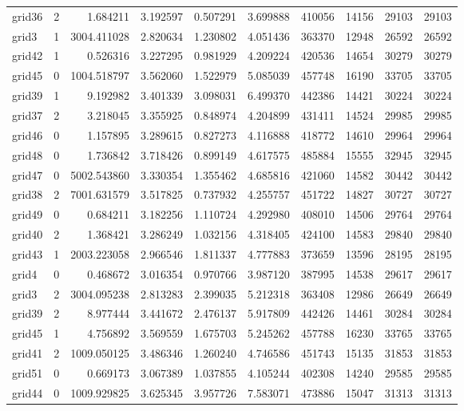 \documentclass[../../../thesis.tex]{subfiles}
\begin{document}
\begin{longtable}{|l|r|r|r|r|r|r|r|r|r|}
grid36 & 2 & 1.684211 & 3.192597 & 0.507291 & 3.699888 & 410056 & 14156 & 29103 & 29103 \\
grid3 & 1 & 3004.411028 & 2.820634 & 1.230802 & 4.051436 & 363370 & 12948 & 26592 & 26592 \\
grid42 & 1 & 0.526316 & 3.227295 & 0.981929 & 4.209224 & 420536 & 14654 & 30279 & 30279 \\
grid45 & 0 & 1004.518797 & 3.562060 & 1.522979 & 5.085039 & 457748 & 16190 & 33705 & 33705 \\
grid39 & 1 & 9.192982 & 3.401339 & 3.098031 & 6.499370 & 442386 & 14421 & 30224 & 30224 \\
grid37 & 2 & 3.218045 & 3.355925 & 0.848974 & 4.204899 & 431411 & 14524 & 29985 & 29985 \\
grid46 & 0 & 1.157895 & 3.289615 & 0.827273 & 4.116888 & 418772 & 14610 & 29964 & 29964 \\
grid48 & 0 & 1.736842 & 3.718426 & 0.899149 & 4.617575 & 485884 & 15555 & 32945 & 32945 \\
grid47 & 0 & 5002.543860 & 3.330354 & 1.355462 & 4.685816 & 421060 & 14582 & 30442 & 30442 \\
grid38 & 2 & 7001.631579 & 3.517825 & 0.737932 & 4.255757 & 451722 & 14827 & 30727 & 30727 \\
grid49 & 0 & 0.684211 & 3.182256 & 1.110724 & 4.292980 & 408010 & 14506 & 29764 & 29764 \\
grid40 & 2 & 1.368421 & 3.286249 & 1.032156 & 4.318405 & 424100 & 14583 & 29840 & 29840 \\
grid43 & 1 & 2003.223058 & 2.966546 & 1.811337 & 4.777883 & 373659 & 13596 & 28195 & 28195 \\
grid4 & 0 & 0.468672 & 3.016354 & 0.970766 & 3.987120 & 387995 & 14538 & 29617 & 29617 \\
grid3 & 2 & 3004.095238 & 2.813283 & 2.399035 & 5.212318 & 363408 & 12986 & 26649 & 26649 \\
grid39 & 2 & 8.977444 & 3.441672 & 2.476137 & 5.917809 & 442426 & 14461 & 30284 & 30284 \\
grid45 & 1 & 4.756892 & 3.569559 & 1.675703 & 5.245262 & 457788 & 16230 & 33765 & 33765 \\
grid41 & 2 & 1009.050125 & 3.486346 & 1.260240 & 4.746586 & 451743 & 15135 & 31853 & 31853 \\
grid51 & 0 & 0.669173 & 3.067389 & 1.037855 & 4.105244 & 402308 & 14240 & 29585 & 29585 \\
grid44 & 0 & 1009.929825 & 3.625345 & 3.957726 & 7.583071 & 473886 & 15047 & 31313 & 31313 \\

\end{longtable}
\end{document}
